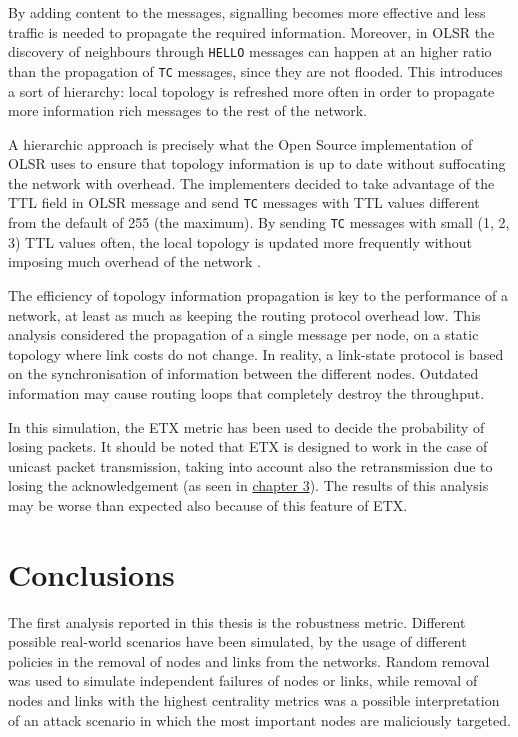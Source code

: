 \documentclass[a4paper,11pt,twoside,openright]{memoir}
\begin{document}
By adding content to the messages, signalling becomes more effective and
less traffic is needed to propagate the required information.
Moreover, in OLSR the discovery of neighbours through \texttt{HELLO}
messages can happen at an higher ratio than the propagation of \texttt{TC}
messages, since they are not flooded.
This introduces a sort of hierarchy: local topology is refreshed more often
in order to propagate more information rich messages to the rest of the network.

A hierarchic approach is precisely what the Open Source implementation of OLSR
uses to ensure that topology information is up to date without suffocating
the network with overhead. The implementers decided to take advantage of the
TTL field in OLSR message and send \texttt{TC} messages with TTL values
different from the default of 255 (the maximum). By sending \texttt{TC}
messages with small (1, 2, 3) TTL values often, the local topology is
updated more frequently without imposing much overhead of the network
\cite{_olsr_????}.

The efficiency of topology information propagation is key to the performance of
a network, at least as much as keeping the routing protocol overhead low.
This analysis considered the propagation of a single message per node, on a
static topology where link costs do not change.
In reality, a link-state protocol is based on the synchronisation of information
between the different nodes. Outdated information may cause routing loops that
completely destroy the throughput.

In this simulation, the ETX metric has been used to decide the probability of
losing packets. It should be noted that ETX is designed to work in the case
of unicast packet transmission, taking into account also the retransmission due to
losing the acknowledgement (as seen in \hyperref[olsr-survey]{chapter 3}).
The results of this analysis may be worse
than expected also because of this feature of ETX.

\chapter{Conclusions}\label{conclusions}

The first analysis reported in this thesis is the robustness metric.
Different possible real-world scenarios have been simulated, by the usage
of different policies in the removal of nodes and links from the networks.
Random removal was used to simulate independent failures of nodes or links,
while removal of nodes and links with the highest centrality metrics was a
possible interpretation of an attack scenario in which the most important
nodes are maliciously targeted.
\end{document}
